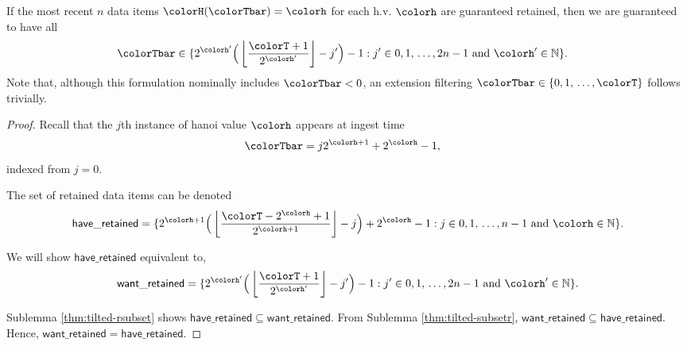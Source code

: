 \begin{lemma}
\label{thm:retained-equivalence-tilted}
If the most recent $n$ data items $\colorH(\colorTbar) = \colorh$ for each h.v. $\colorh$ are guaranteed retained, then we are guaranteed to have all
\begin{align*}
\colorTbar
&\in
\{
  2^{\colorh'}\Big(\left\lfloor \frac{\colorT + 1}{2^{\colorh'}} \right\rfloor - j'\Big) - 1
  :
  j' \in 0,1,\,\ldots,2n-1
  \text{ and }
  \colorh' \in \mathbb{N}
\}.
\end{align*}
Note that, although this formulation nominally includes $\colorTbar < 0$, an extension filtering $\colorTbar \in \{0,1,\,\ldots,\colorT\}$ follows trivially.
\end{lemma}
\begin{proof}

Recall that the $j$th instance of hanoi value $\colorh$ appears at ingest time
\begin{align*}
\colorTbar
&= j2^{\colorh + 1} + 2^{\colorh} - 1,
\end{align*}
indexed from $j=0$.

The set of retained data items can be denoted
\begin{align*}
\mathsf{have\_retained} =
\{
  2^{\colorh + 1}\Big( \left\lfloor\frac{\colorT - 2^{\colorh} + 1}{2^{\colorh + 1}} \right\rfloor - j\Big) + 2^{\colorh} - 1
  :
  j \in 0,1,\,\ldots,n-1
  \text{ and }
  \colorh \in \mathbb{N}
\}.
\end{align*}

We will show $\mathsf{have\_retained}$ equivalent to,
\begin{align*}
\mathsf{want\_retained} =
\{
  2^{\colorh'}\Big(\left\lfloor \frac{\colorT + 1}{2^{\colorh'}} \right\rfloor - j'\Big) - 1
  :
  j' \in 0,1,\,\ldots,2n-1
  \text{ and }
  \colorh' \in \mathbb{N}
\}.
\end{align*}

Sublemma \ref{thm:tilted-rsubset} shows $\mathsf{have\_retained} \subseteq \mathsf{want\_retained}$.
From Sublemma \ref{thm:tilted-subsetr}, $\mathsf{want\_retained} \subseteq \mathsf{have\_retained}$.
Hence, $\mathsf{want\_retained} = \mathsf{have\_retained}$.

\end{proof}

